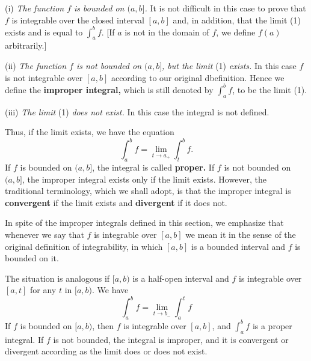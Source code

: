 (i) \textit{The function $f$ is bounded on $(a, b]$.}  It is not difficult in this case to prove that $f$ is integrable over the closed interval $[a, b]$ and, in addition, that the limit (1) exists and is equal to $\int_a^b f$. [If $a$ is not in the domain of $f$, we define $f(a)$ arbitrarily.]

(ii) \textit{The function $f$ is not bounded on $(a, b]$, but the limit} (1) \textit{exists.} In this case $f$ is not integrable over $[a, b]$ according to our original dbefinition. Hence we define the \textbf{improper integral,} which is still denoted by $\int_a^b f$, to be the limit (1).

(iii) \textit{The limit} (1) \textit{does not exist.} In this case the integral is not defined. 

Thus, if the limit exists, we have the equation
$$
\int_a^b f = \lim_{t \rightarrow a_{+}} \int_t^b f. 
$$
\noindent If $f$ is bounded on $(a, b]$, the integral is called \textbf{proper.}  If $f$ is not bounded on $(a, b]$, the improper integral exists only if the limit exists. However, the traditional terminology, which we shall adopt, is that the improper integral is \textbf{convergent} if the limit exists and \textbf{divergent} if it does not.

In spite of the improper integrals defined in this section, we emphasize that whenever we say that $f$ is integrable over $[a, b]$ we mean it in the sense of the original definition of integrability, in which $[a, b]$ is a bounded interval and $f$ is bounded on it.

The situation is analogous if $[a, b)$ is a half-open interval and $f$ is integrable over $[a, t]$ for any $t$ in $[a, b)$. We have
$$
\int_a^b f= \lim_{t \rightarrow b_{-}} \int_a^t f  
$$
\noindent If $f$ is bounded on $[a, b)$, then $f$ is integrable over $[a, b]$, and $\int_a^b f$ is a proper integral. If $f$ is not bounded, the integral is improper, and it is convergent or divergent according as the limit does or does not exist.


